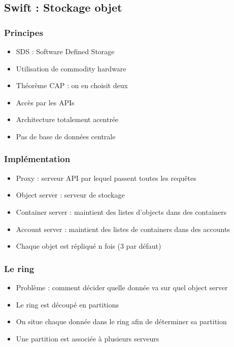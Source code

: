   \subsection[Swift]{Swift : Stockage objet}

  \begin{frame}
    \frametitle{Principes}
    \begin{itemize}
      \item SDS : Software Defined Storage
      \item Utilisation de commodity hardware
      \item Théorème CAP : on en choisit deux
      \item Accès par les APIs
      \item Architecture totalement acentrée
      \item Pas de base de données centrale
    \end{itemize}
  \end{frame}

  \begin{frame}
    \frametitle{Implémentation}
    \begin{itemize}
      \item Proxy : serveur API par lequel passent toutes les requêtes
      \item Object server : serveur de stockage
      \item Container server : maintient des listes d'objects dans des containers
      \item Account server : maintient des listes de containers dans des accounts
      \item Chaque objet est répliqué n fois (3 par défaut)
    \end{itemize}
  \end{frame}

  \begin{frame}
    \frametitle{Le ring}
    \begin{itemize}
      \item Problème : comment décider quelle donnée va sur quel object server
      \item Le ring est découpé en partitions
      \item On situe chaque donnée dans le ring afin de déterminer sa partition
      \item Une partition est associée à plusieurs serveurs
    \end{itemize}
  \end{frame}


